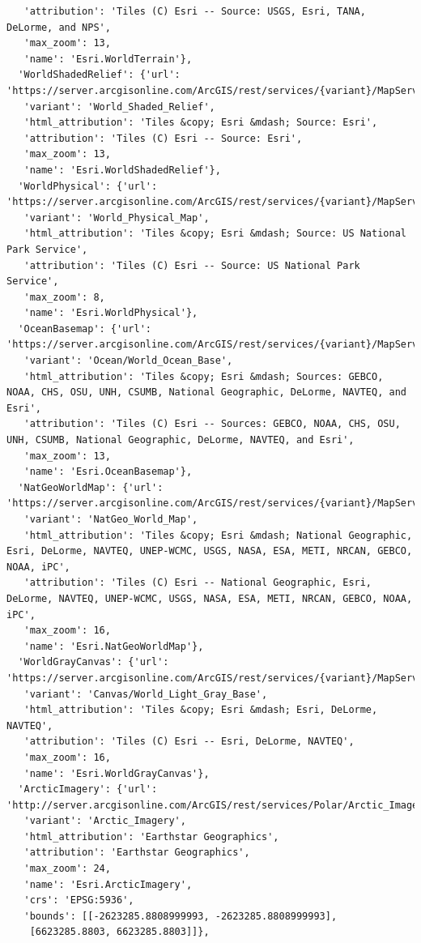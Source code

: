 \documentclass[
  letterpaper,
  DIV=11,
  numbers=noendperiod]{scrreprt}
\begin{document}
\begin{verbatim}
   'attribution': 'Tiles (C) Esri -- Source: USGS, Esri, TANA, DeLorme, and NPS',
   'max_zoom': 13,
   'name': 'Esri.WorldTerrain'},
  'WorldShadedRelief': {'url': 'https://server.arcgisonline.com/ArcGIS/rest/services/{variant}/MapServer/tile/{z}/{y}/{x}',
   'variant': 'World_Shaded_Relief',
   'html_attribution': 'Tiles &copy; Esri &mdash; Source: Esri',
   'attribution': 'Tiles (C) Esri -- Source: Esri',
   'max_zoom': 13,
   'name': 'Esri.WorldShadedRelief'},
  'WorldPhysical': {'url': 'https://server.arcgisonline.com/ArcGIS/rest/services/{variant}/MapServer/tile/{z}/{y}/{x}',
   'variant': 'World_Physical_Map',
   'html_attribution': 'Tiles &copy; Esri &mdash; Source: US National Park Service',
   'attribution': 'Tiles (C) Esri -- Source: US National Park Service',
   'max_zoom': 8,
   'name': 'Esri.WorldPhysical'},
  'OceanBasemap': {'url': 'https://server.arcgisonline.com/ArcGIS/rest/services/{variant}/MapServer/tile/{z}/{y}/{x}',
   'variant': 'Ocean/World_Ocean_Base',
   'html_attribution': 'Tiles &copy; Esri &mdash; Sources: GEBCO, NOAA, CHS, OSU, UNH, CSUMB, National Geographic, DeLorme, NAVTEQ, and Esri',
   'attribution': 'Tiles (C) Esri -- Sources: GEBCO, NOAA, CHS, OSU, UNH, CSUMB, National Geographic, DeLorme, NAVTEQ, and Esri',
   'max_zoom': 13,
   'name': 'Esri.OceanBasemap'},
  'NatGeoWorldMap': {'url': 'https://server.arcgisonline.com/ArcGIS/rest/services/{variant}/MapServer/tile/{z}/{y}/{x}',
   'variant': 'NatGeo_World_Map',
   'html_attribution': 'Tiles &copy; Esri &mdash; National Geographic, Esri, DeLorme, NAVTEQ, UNEP-WCMC, USGS, NASA, ESA, METI, NRCAN, GEBCO, NOAA, iPC',
   'attribution': 'Tiles (C) Esri -- National Geographic, Esri, DeLorme, NAVTEQ, UNEP-WCMC, USGS, NASA, ESA, METI, NRCAN, GEBCO, NOAA, iPC',
   'max_zoom': 16,
   'name': 'Esri.NatGeoWorldMap'},
  'WorldGrayCanvas': {'url': 'https://server.arcgisonline.com/ArcGIS/rest/services/{variant}/MapServer/tile/{z}/{y}/{x}',
   'variant': 'Canvas/World_Light_Gray_Base',
   'html_attribution': 'Tiles &copy; Esri &mdash; Esri, DeLorme, NAVTEQ',
   'attribution': 'Tiles (C) Esri -- Esri, DeLorme, NAVTEQ',
   'max_zoom': 16,
   'name': 'Esri.WorldGrayCanvas'},
  'ArcticImagery': {'url': 'http://server.arcgisonline.com/ArcGIS/rest/services/Polar/Arctic_Imagery/MapServer/tile/{z}/{y}/{x}',
   'variant': 'Arctic_Imagery',
   'html_attribution': 'Earthstar Geographics',
   'attribution': 'Earthstar Geographics',
   'max_zoom': 24,
   'name': 'Esri.ArcticImagery',
   'crs': 'EPSG:5936',
   'bounds': [[-2623285.8808999993, -2623285.8808999993],
    [6623285.8803, 6623285.8803]]},

\end{verbatim}
\end{document}
